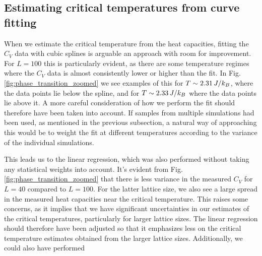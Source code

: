 \subsection{Estimating critical temperatures from curve fitting}\label{subsec_discussion:critical_temps_curvefit}
When we estimate the critical temperature from the heat capacities, fitting the $C_V$ data with cubic splines is arguable an approach with room for improvement. For $L=100$ this is particularly evident, as there are some temperature regimes where the $C_V$ data is almost consistently lower or higher than the fit. In Fig. \ref{fig:phase_transition_zoomed} we see examples of this for $T\sim2.31\,J/k_B$, where the data points lie below the spline, and for $T\sim2.33\,J/k_B$ where the data points lie above it. A more careful consideration of how we perform the fit should therefore have been taken into account. If samples from multiple simulations had been used, as mentioned in the previous subsection, a natural way of approaching this would be to weight the fit at different temperatures according to the variance of the individual simulations.  

This leads us to the linear regression, which was also performed without taking any statistical weights into account. It's evident from Fig. \ref{fig:phase_transition_zoomed} that there is less variance in the measured $C_V$ for $L=40$ compared to $L=100$. For the latter lattice size, we also see a large spread in the measured heat capacities near the critical temperature. This raises some concerns, as it implies that we have significant uncertainties in our estimates of the critical temperatures, particularly for larger lattice sizes. The linear regression should therefore have been adjusted so that it emphasizes less on the critical temperature estimates obtained from the larger lattice sizes. Additionally, we could also have performed  


